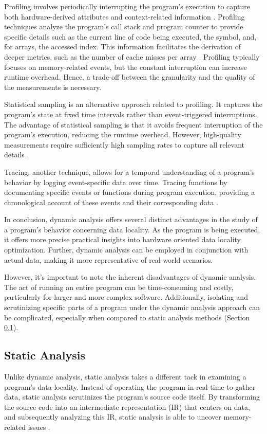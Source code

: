 Profiling involves periodically interrupting the program's execution to capture both hardware-derived attributes and context-related information \cite{itzkowitz2003memory,gimenez2017memaxes,adhianto2010hpctoolkit}. Profiling techniques analyze the program's call stack and program counter to provide specific details such as the current line of code being executed, the symbol, and, for arrays, the accessed index. This information facilitates the derivation of deeper metrics, such as the number of cache misses per array \cite{adhianto2010hpctoolkit}. Profiling typically focuses on memory-related events, but the constant interruption can increase runtime overhead. Hence, a trade-off between the granularity and the quality of the measurements is necessary.

Statistical sampling is an alternative approach related to profiling. It captures the program's state at fixed time intervals rather than event-triggered interruptions. The advantage of statistical sampling is that it avoids frequent interruption of the program's execution, reducing the runtime overhead. However, high-quality measurements require sufficiently high sampling rates to capture all relevant details \cite{adhianto2010hpctoolkit}.

Tracing, another technique, allows for a temporal understanding of a program's behavior by logging event-specific data over time. Tracing functions by documenting specific events or functions during program execution, providing a chronological account of these events and their corresponding data \cite{shende1999profiling,adhianto2010hpctoolkit,mckinley1999quantifying}.

In conclusion, dynamic analysis offers several distinct advantages in the study of a program's behavior concerning data locality. As the program is being executed, it offers more precise practical insights into hardware oriented data locality optimization. Further, dynamic analysis can be employed in conjunction with actual data, making it more representative of real-world scenarios.

However, it's important to note the inherent disadvantages of dynamic analysis. The act of running an entire program can be time-consuming and costly, particularly for larger and more complex software. Additionally, isolating and scrutinizing specific parts of a program under the dynamic analysis approach can be complicated, especially when compared to static analysis methods (Section \ref{sec:static_analysis}).

\subsection{Static Analysis}\label{sec:static_analysis}
Unlike dynamic analysis, static analysis takes a different tack in examining a program's data locality. Instead of operating the program in real-time to gather data, static analysis scrutinizes the program's source code itself. By transforming the source code into an intermediate representation (IR) that centers on data, and subsequently analyzing this IR, static analysis is able to uncover memory-related issues \cite{schaad2022boosting,schaad2021boosting,calotoiu2022lifting,ben2023bridging}.

